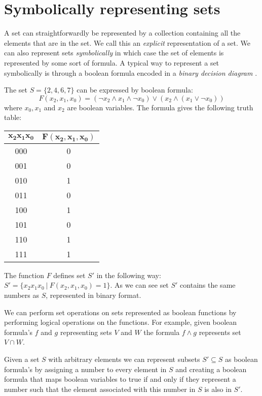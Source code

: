 \section{Symbolically representing sets}
A set can straightforwardly be represented by a collection containing all the elements that are in the set. We call this an \textit{explicit} representation of a set. We can also represent sets \textit{symbolically} in which case the set of elements is represented by some sort of formula. A typical way to represent a set symbolically is through a boolean formula encoded in a \textit{binary decision diagram} \cite{BDD_running_time,Handbook_BDD_Chapter}. 

\begin{example}
	\label{ex_boolform}
	The set $S = \{ 2,4,6,7 \}$ can be expressed by boolean formula:
	\[ F(x_2,x_1,x_0) = (\neg x_2 \wedge x_1 \wedge \neg x_0) \vee (x_2 \wedge (x_1 \vee \neg x_0)) \]
	where $x_0,x_1$ and $x_2$ are boolean variables. The formula gives the following truth table:\\
	\begin{center}
		\begin{tabular}{|c|c|}
			\hline 
			$\mathbf{x_2x_1x_0}$ & $\mathbf{F(x_2,x_1,x_0)}$ \\ 
			\hline 
			000 & 0 \\ 
			\hline 
			001 & 0 \\ 
			\hline 
			010 & 1 \\ 
			\hline 
			011 & 0 \\ 
			\hline 
			100 & 1 \\ 
			\hline 
			101 & 0 \\ 
			\hline 
			110 & 1 \\ 
			\hline 
			111 & 1 \\ 
			\hline
		\end{tabular} 
	\end{center}
	The function $F$ defines set $S'$ in the following way: $S' = \{x_2x_1x_0\ |\ F(x_2,x_1,x_0) = 1 \}$. As we can see set $S'$ contains the same numbers as $S$, represented in binary format.
\end{example}
We can perform set operations on sets represented as boolean functions by performing logical operations on the functions. For example, given boolean formula's $f$ and $g$ representing sets $V$ and $W$ the formula $f \wedge g$ represents set $V \cap W$.

Given a set $S$ with arbitrary elements we can represent subsets $S' \subseteq S$ as boolean formula's by assigning a number to every element in $S$ and creating a boolean formula that maps boolean variables to true if and only if they represent a number such that the element associated with this number in $S$ is also in $S'$.

